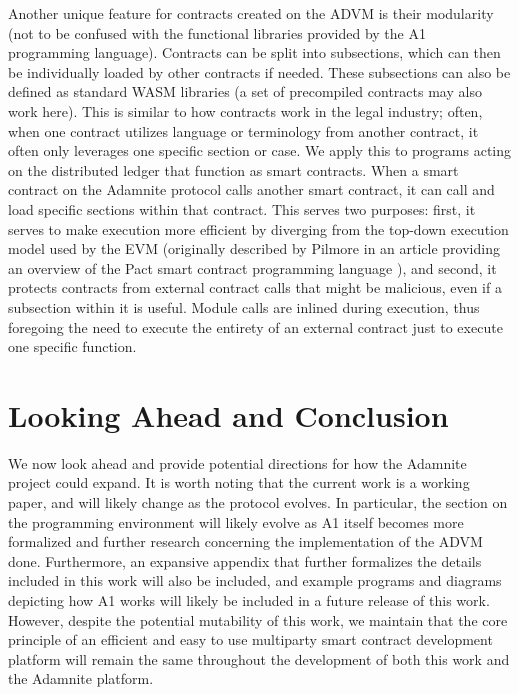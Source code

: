 \documentclass[conference]{IEEEtran}
\begin{document}
Another unique feature for contracts created on the ADVM is their modularity (not to be confused with the functional libraries provided by the A1 programming language). Contracts can be split into subsections, which can then be individually loaded by other contracts if needed. These subsections can also be defined as standard WASM libraries (a set of precompiled contracts may also work here). This is similar to how contracts work in the legal industry; often, when one contract utilizes language or terminology from another contract, it often only leverages one specific section or case. We apply this to programs acting on the distributed ledger that function as smart contracts. When a smart contract on the Adamnite protocol calls another smart contract, it can call and load specific sections within that contract. This serves two purposes: first, it serves to make execution more efficient by diverging from the  top-down execution model used by the EVM (originally described by Pilmore in an article providing an overview of the Pact smart contract programming language \cite{pilmore2019EVM}), and second, it protects contracts from external contract calls that might be malicious, even if a subsection within it is useful. Module calls are inlined during execution, thus foregoing the need to execute the entirety of an external contract just to execute one specific function. 


\section{Looking Ahead and Conclusion}
We now look ahead and provide potential directions for how the Adamnite project could expand. It is worth noting that the current work is a working paper, and will likely change as the protocol evolves. In particular, the section on the programming environment will likely evolve as A1 itself becomes more formalized and further research concerning the implementation of the ADVM done. Furthermore, an expansive appendix that further formalizes the details included in this work will also be included, and example programs and diagrams depicting how A1 works will likely be included in a future release of this work. However, despite the potential mutability of this work, we maintain that the core principle of an efficient and easy to use multiparty smart contract development platform will remain the same throughout the development of both this work and the Adamnite platform. 
\end{document}
